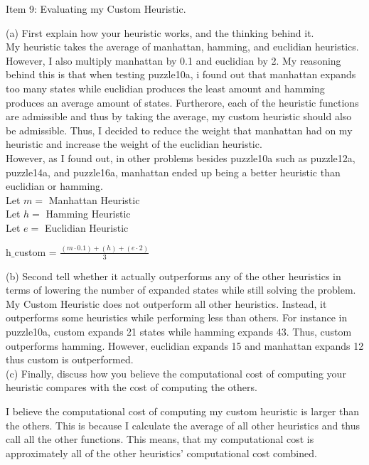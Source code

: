 \documentclass[12pt]{exam}
\begin{document}
\begin{questions}
\question Item 9: Evaluating my Custom Heuristic.

(a) First explain how your heuristic works, and the thinking behind it.\\
        
    My heuristic takes the average of manhattan, hamming, and euclidian heuristics. However, I also multiply manhattan by 0.1 and euclidian by 2. My reasoning behind this is that when testing puzzle10a, i found out that manhattan expands too many states while euclidian produces the least amount and hamming produces an average amount of states. Furtherore, each of the heuristic functions are admissible and thus by taking the average, my custom heuristic should also be admissible. Thus, I decided to reduce the weight that manhattan had on my heuristic and increase the weight of the euclidian heuristic.\\

    However, as I found out, in other problems besides puzzle10a such as puzzle12a, puzzle14a, and puzzle16a, manhattan ended up being a better heuristic than euclidian or hamming.\\

Let $m = $ Manhattan Heuristic\\
Let $h = $ Hamming Heuristic\\
Let $e = $ Euclidian Heuristic\\
    \begin{center}
    h$\_$custom = $\frac{(m\cdot0.1) + (h) + (e\cdot 2)}{3}$
    \end{center}

(b) Second tell whether it actually outperforms any of the other heuristics in terms of lowering the number of expanded states while still solving the problem. \\

My Custom Heuristic does not outperform all other heuristics. Instead, it outperforms some heuristics while performing less than others. For instance in puzzle10a, custom expands 21 states while hamming expands 43. Thus, custom outperforms hamming. However, euclidian expands 15 and manhattan expands 12 thus custom is outperformed.\\

(c) Finally, discuss how you believe the computational cost of computing your heuristic compares with the cost of computing the others.

    I believe the computational cost of computing my custom heuristic is larger than the others. This is because I calculate the average of all other heuristics and thus call all the other functions. This means, that my computational cost is approximately all of the other heuristics' computational cost combined.\\


\end{questions}
\end{document}
